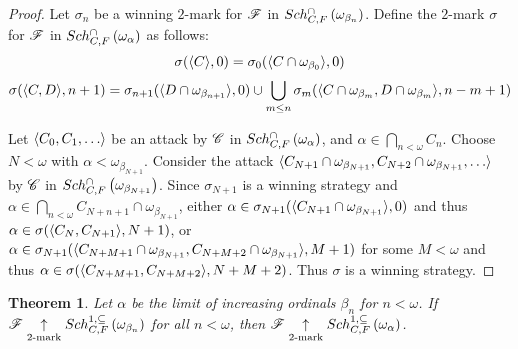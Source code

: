 \documentclass{amsart}
\theoremstyle{plain}
\newtheorem{theorem}{Theorem}
\theoremstyle{definition}
\theoremstyle{remark}
\theoremstyle{plain}
\theoremstyle{definition}
\theoremstyle{remark}
\begin{document}
  \begin{proof}
    Let \(\sigma_n\) be a winning \(2\)-mark for \(\mathscr{F}\) in
    \(Sch^{\cap}_{C,F}\left({\omega_{\beta_n}}\right)\). Define the \(2\)-mark \(\sigma\)
    for \(\mathscr{F}\) in \(Sch^{\cap}_{C,F}\left({\omega_\alpha}\right)\) as follows:
    \[
      \sigma(\langle C\rangle,0)
        =
      \sigma_0(\langle C\cap\omega_{\beta_0}\rangle,0)
    \]
    \[
      \sigma(\langle C,D\rangle,n+1)
        =
      \sigma_{n+1}(\langle D\cap\omega_{\beta_{n+1}}\rangle,0)
        \cup
      \bigcup_{m\leq n}
      \sigma_m(\langle C\cap\omega_{\beta_m},D\cap\omega_{\beta_m}\rangle,n-m+1)
    \]

    Let \(\<C_0,C_1,\dots\>\) be an attack by
    \(\mathscr{C}\) in \(Sch^{\cap}_{C,F}\left({\omega_\alpha}\right)\), and
    \(\alpha\in\bigcap_{n<\omega}C_n\).
    Choose \(N<\omega\) with \(\alpha<\omega_{\beta_{N+1}}\). Consider the
    attack
    \(\<C_{N+1}\cap\omega_{\beta_{N+1}},C_{N+2}\cap\omega_{\beta_{N+1}},\dots\>\)
    by \(\mathscr{C}\) in \(Sch^{\cap}_{C,F}\left({\omega_{\beta_{N+1}}}\right)\). Since
    \(\sigma_{N+1}\) is a winning strategy and
    \(\alpha\in\bigcap_{n<\omega}C_{N+n+1}\cap\omega_{\beta_{N+1}}\), either
    \(\alpha\in\sigma_{N+1}(\langle C_{N+1}\cap\omega_{\beta_{N+1}}\rangle,0)\) and thus
    \(\alpha\in\sigma(\langle C_N,C_{N+1}\rangle,N+1)\), or
    \(
      \alpha
        \in
      \sigma_{N+1}(
        \langle C_{N+M+1}\cap\omega_{\beta_{N+1}},C_{N+M+2}\cap\omega_{\beta_{N+1}}\rangle
        ,M+1
      )
    \)
    for some \(M<\omega\) and thus
    \(
      \alpha
        \in
      \sigma(
        \langle C_{N+M+1},C_{N+M+2}\rangle,
        N+M+2
      )
    \). Thus \(\sigma\) is a winning strategy.
  \end{proof}

  \begin{theorem}
    Let \(\alpha\) be the limit of increasing ordinals \(\beta_n\) for \(n<\omega\).
    If \(\mathscr{F} \underset{2\text{-mark}}{\uparrow}Sch^{1,\subseteq}_{C,F}\left({\omega_{\beta_n}}\right)\) for all
    \(n<\omega\), then \(\mathscr{F}\underset{2\text{-mark}}{\uparrow}Sch^{1,\subseteq}_{C,F}\left({\omega_\alpha}\right)\).
  \end{theorem}
\end{document}
